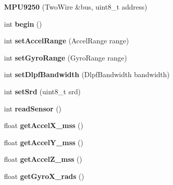 \begin{DoxyCompactItemize}
\item 
\mbox{\label{class_m_p_u9250_acaf2ae31cfdeb6d47b922996feb55b69}} 
{\bfseries M\+P\+U9250} (Two\+Wire \&bus, uint8\+\_\+t address)
\item 
\mbox{\label{class_m_p_u9250_ab0e26058e7148ebf5af4569138337a02}} 
int {\bfseries begin} ()
\item 
\mbox{\label{class_m_p_u9250_a469a02366142d54fb58e39880ea7fa01}} 
int {\bfseries set\+Accel\+Range} (Accel\+Range range)
\item 
\mbox{\label{class_m_p_u9250_a472679872163e0c4994ae125982d5fd2}} 
int {\bfseries set\+Gyro\+Range} (Gyro\+Range range)
\item 
\mbox{\label{class_m_p_u9250_a0b3804d17270a7bfe40f2e31e2e4bdc8}} 
int {\bfseries set\+Dlpf\+Bandwidth} (Dlpf\+Bandwidth bandwidth)
\item 
\mbox{\label{class_m_p_u9250_a969857ba25ba11cc34eb900ca6428817}} 
int {\bfseries set\+Srd} (uint8\+\_\+t srd)
\item 
\mbox{\label{class_m_p_u9250_aff5c0acd0797c79230d78c5e6c8a6321}} 
int {\bfseries read\+Sensor} ()
\item 
\mbox{\label{class_m_p_u9250_ab9daf3fb8328d3fb3ae77a0fa0957a7e}} 
float {\bfseries get\+Accel\+X\+\_\+mss} ()
\item 
\mbox{\label{class_m_p_u9250_ad3cbdd7b229e429b77c06cfabee778a1}} 
float {\bfseries get\+Accel\+Y\+\_\+mss} ()
\item 
\mbox{\label{class_m_p_u9250_a58a1600a522933cd5cbd9a8f5ffc4536}} 
float {\bfseries get\+Accel\+Z\+\_\+mss} ()
\item 
\mbox{\label{class_m_p_u9250_a2ec6d66f8a1d381e5a6b558756e3275d}} 
float {\bfseries get\+Gyro\+X\+\_\+rads} ()
\item 
\mbox{\label{class_m_p_u9250_a187251337b4cfb80683cfaaa65ab9e58}} 

\end{DoxyCompactItemize}
